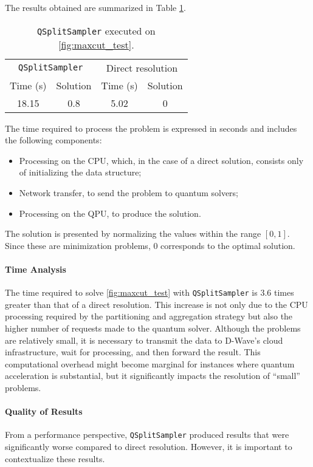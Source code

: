 The results obtained are summarized in Table \ref{tab:maxcut}.

\begin{table}[H]
    \centering
    \begin{tabular}{cccc}
        \toprule
        \multicolumn{2}{c}{\texttt{QSplitSampler}} & \multicolumn{2}{c}{Direct resolution} \\
        Time (s) & Solution & Time (s) & Solution \\
        \midrule
        18.15 & 0.8 & 5.02 & 0        
    \end{tabular}
    \caption{\texttt{QSplitSampler} executed on \ref{fig:maxcut_test}.}
    \label{tab:maxcut}
\end{table}

The time required to process the problem is expressed in seconds and includes the following components: 
\begin{itemize} 
    \item Processing on the CPU, which, in the case of a direct solution, consists only of initializing the data structure; 
    \item Network transfer, to send the problem to quantum solvers;
    \item Processing on the QPU, to produce the solution. 
\end{itemize}

The solution is presented by normalizing the values within the range $[0, 1]$. 
Since these are minimization problems, $0$ corresponds to the optimal solution.

\paragraph{Time Analysis} The time required to solve \ref{fig:maxcut_test} with \texttt{QSplitSampler} is 3.6 times greater than that of a direct resolution. 
This increase is not only due to the CPU processing required by the partitioning and aggregation strategy but also the higher number of requests made to the quantum solver. 
Although the problems are relatively small, it is necessary to transmit the data to D-Wave's cloud infrastructure, wait for processing, and then forward the result. 
This computational overhead might become marginal for instances where quantum acceleration is substantial, but it significantly impacts the resolution of ``small'' problems.

\paragraph{Quality of Results} From a performance perspective, \texttt{QSplitSampler} produced results that were significantly worse compared to direct resolution. 
However, it is important to contextualize these results.

